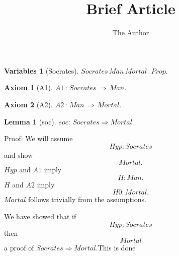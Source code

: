 \documentclass[11pt, oneside]{article}
\title{Brief Article}
\author{The Author}
\date{}							%
\newtheorem{Lemma}{Lemma}
\newtheorem{Variables}{Variables}
\newtheorem{Axiom}{Axiom}
\begin{document}
\maketitle

\begin{Variables}[Socrates] \label{Variables:Socrates}
$Socrates\,Man\,Mortal\,:Prop.$
 \end{Variables}
\begin{Axiom}[A1] \label{Axiom:A1}
$A1\,:\,Socrates\,\Rightarrow \,Man.$
 \end{Axiom}
\begin{Axiom}[A2] \label{Axiom:A2}
$A2\,:\,Man\,\Rightarrow \,Mortal.$
 \end{Axiom}
\begin{Lemma}[soc] \label{Lemma:soc}
$soc:\,Socrates\Rightarrow Mortal.$
 \end{Lemma}


 Proof: We will assume $$Hyp : Socrates $$ and show $$Mortal .$$$Hyp$ and $A1$ imply $$H : Man .$$ $H$ and $A2$ imply $$H0 : Mortal .$$ $Mortal $ follows trivially from the assumptions.

 We have showed that if $$Hyp : Socrates $$ then $$Mortal $$ a proof of $Socrates \Rightarrow Mortal $.This is done
\end{document}
